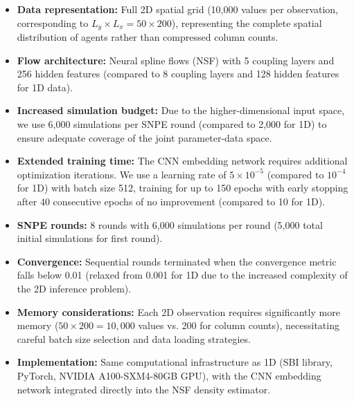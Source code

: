 \begin{itemize}
	\item \textbf{Data representation:} Full 2D spatial grid (10,000 values per observation, corresponding to $L_y \times L_x = 50 \times 200$), representing the complete spatial distribution of agents rather than compressed column counts.

	\item \textbf{Flow architecture:} Neural spline flows (NSF) with 5 coupling layers and 256 hidden features (compared to 8 coupling layers and 128 hidden features for 1D data).

	\item \textbf{Increased simulation budget:} Due to the higher-dimensional input space, we use 6,000 simulations per SNPE round (compared to 2,000 for 1D) to ensure adequate coverage of the joint parameter-data space.

	\item \textbf{Extended training time:} The CNN embedding network requires additional optimization iterations. We use a learning rate of $5 \times 10^{-5}$ (compared to $10^{-4}$ for 1D) with batch size 512, training for up to 150 epochs with early stopping after 40 consecutive epochs of no improvement (compared to 10 for 1D).

	\item \textbf{SNPE rounds:} 8 rounds with 6,000 simulations per round (5,000 total initial simulations for first round).

	\item \textbf{Convergence:} Sequential rounds terminated when the convergence metric falls below 0.01 (relaxed from 0.001 for 1D due to the increased complexity of the 2D inference problem).

	\item \textbf{Memory considerations:} Each 2D observation requires significantly more memory ($50 \times 200 = 10,000$ values vs. 200 for column counts), necessitating careful batch size selection and data loading strategies.

	\item \textbf{Implementation:} Same computational infrastructure as 1D (SBI library, PyTorch, NVIDIA A100-SXM4-80GB GPU), with the CNN embedding network integrated directly into the NSF density estimator.
\end{itemize}
